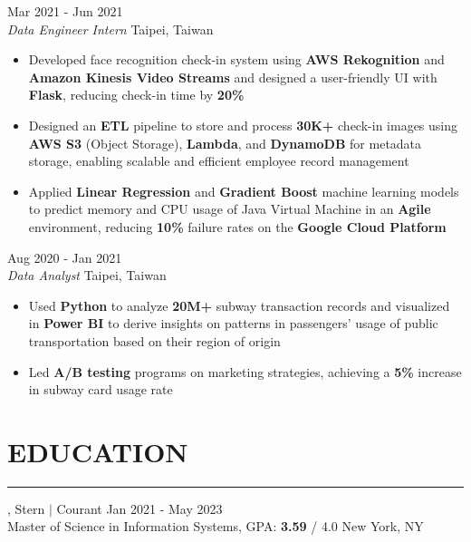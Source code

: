 \documentclass[11pt,letterpaper]{article}
\begin{document}
\vspace{4pt}
 \hfill Mar 2021 - Jun 2021\\[-1pt]
\textit{Data Engineer Intern} \hfill Taipei, Taiwan
\begin{itemize}[leftmargin=1.5em, rightmargin=0pt, itemsep=-1pt, topsep=-1pt, parsep=0pt]
  \item \justifying Developed face recognition check-in system using \textbf{AWS Rekognition} and \textbf{Amazon Kinesis Video Streams} and designed a user-friendly UI with \textbf{Flask}, reducing check-in time by \textbf{20\%}
  \item \justifying Designed an \textbf{ETL} pipeline to store and process \textbf{30K+} check-in images using \textbf{AWS S3} (Object Storage), \textbf{Lambda}, and \textbf{DynamoDB} for metadata storage, enabling scalable and efficient employee record management
  \item \justifying Applied \textbf{Linear Regression} and \textbf{Gradient Boost} machine learning models to predict memory and CPU usage of Java Virtual Machine in an \textbf{Agile} environment, reducing \textbf{10\%} failure rates on the \textbf{Google Cloud Platform}
\end{itemize}

\vspace{4pt}
 \hfill Aug 2020 - Jan 2021\\[-1pt]
\textit{Data Analyst} \hfill Taipei, Taiwan
\begin{itemize}[leftmargin=1.5em, rightmargin=0pt, itemsep=-1pt, topsep=-1pt, parsep=0pt]
  \item \justifying Used \textbf{Python} to analyze \textbf{20M+} subway transaction records and visualized in \textbf{Power BI} to derive insights on patterns in passengers' usage of public transportation based on their region of origin
  \item \justifying Led \textbf{A/B testing} programs on marketing strategies, achieving a \textbf{5\%} increase in subway card usage rate
\end{itemize}

\vspace{4pt}
\section*{EDUCATION}
\vspace{-6pt}\noindent\rule{\textwidth}{0.8pt}

\vspace{2pt}
, Stern $|$ Courant \hfill Jan 2021 - May 2023\\[-1pt]
Master of Science in Information Systems, GPA: \textbf{3.59} / 4.0 \hfill New York, NY
\end{document}
